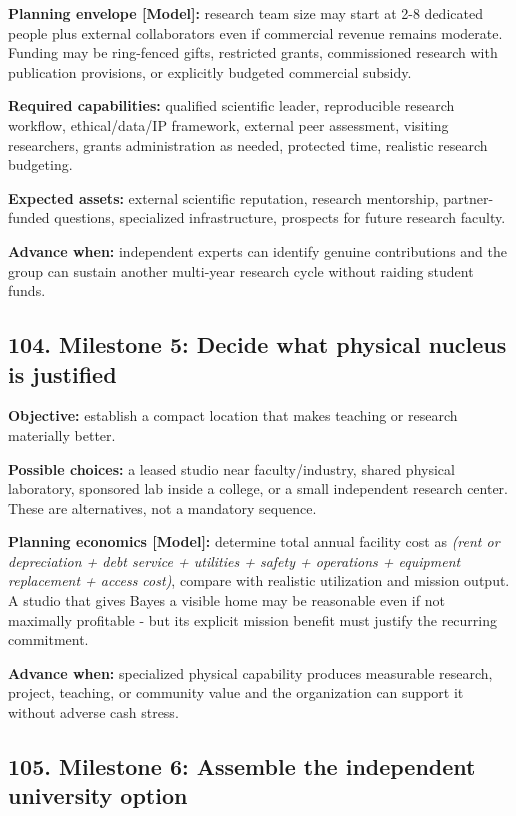 \textbf{Planning envelope \textbf{[Model]}:} research team size may start at 2-8 dedicated people plus external collaborators even if commercial revenue remains moderate. Funding may be ring-fenced gifts, restricted grants, commissioned research with publication provisions, or explicitly budgeted commercial subsidy.

\textbf{Required capabilities:} qualified scientific leader, reproducible research workflow, ethical/\allowbreak data/IP framework, external peer assessment, visiting researchers, grants administration as needed, protected time, realistic research budgeting.

\textbf{Expected assets:} external scientific reputation, research mentorship, partner-funded questions, specialized infrastructure, prospects for future research faculty.

\textbf{Advance when:} independent experts can identify genuine contributions and the group can sustain another multi-year research cycle without raiding student funds.

\subsection{104. Milestone 5: Decide what physical nucleus is justified}

\textbf{Objective:} establish a compact location that makes teaching or research materially better.

\textbf{Possible choices:} a leased studio near faculty/\allowbreak industry, shared physical laboratory, sponsored lab inside a college, or a small independent research center. These are alternatives, not a mandatory sequence.

\textbf{Planning economics \textbf{[Model]}:} determine total annual facility cost as \textit{(rent or depreciation + debt service + utilities + safety + operations + equipment replacement + access cost)}, compare with realistic utilization and mission output. A studio that gives Bayes a visible home may be reasonable even if not maximally profitable - but its explicit mission benefit must justify the recurring commitment.

\textbf{Advance when:} specialized physical capability produces measurable research, project, teaching, or community value and the organization can support it without adverse cash stress.

\subsection{105. Milestone 6: Assemble the independent university option}

